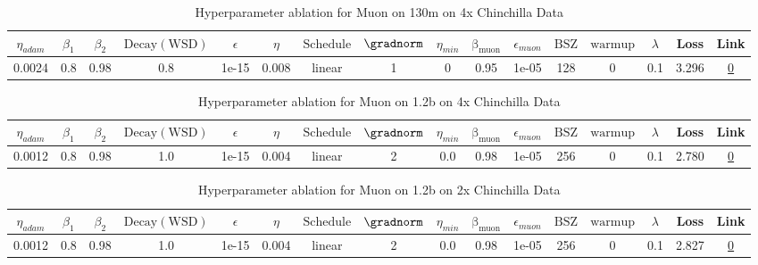 \begin{table}[H]
\centering
\caption{Hyperparameter ablation for Muon on 130m on 4x Chinchilla Data}
\label{tab:ablation_muon_130m_4}
\begin{tabular}{cccccccccccccccc}
\toprule
$\eta_{adam}$ & $\beta_1$ & $\beta_2$ & $\mathrm{Decay (WSD)}$ & $\epsilon$ & $\eta$ & $\mathrm{Schedule}$ & $\gradnorm$ & $\eta_{min}$ & $\mathrm{\beta_{muon}}$ & $\epsilon_{muon}$ & $\mathrm{BSZ}$ & $\mathrm{warmup}$ & $\lambda$ & Loss & Link \\
\midrule
0.0024 & 0.8 & 0.98 & 0.8 & 1e-15 & 0.008 & linear & 1 & 0 & 0.95 & 1e-05 & 128 & 0 & 0.1 & 3.296 & \href{https://wandb.ai/stanford-mercury/optimizer-scaling/runs/sweep-130m-10B-muonz43402blr0.008-wd0.1-minlr0-warmup0-b10.8-b20-82a88f}{0} \\
\midrule
\bottomrule
\end{tabular}
\end{table}

\begin{table}[H]
\centering
\caption{Hyperparameter ablation for Muon on 1.2b on 4x Chinchilla Data}
\label{tab:ablation_muon_1.2b_4}
\begin{tabular}{cccccccccccccccc}
\toprule
$\eta_{adam}$ & $\beta_1$ & $\beta_2$ & $\mathrm{Decay (WSD)}$ & $\epsilon$ & $\eta$ & $\mathrm{Schedule}$ & $\gradnorm$ & $\eta_{min}$ & $\mathrm{\beta_{muon}}$ & $\epsilon_{muon}$ & $\mathrm{BSZ}$ & $\mathrm{warmup}$ & $\lambda$ & Loss & Link \\
\midrule
0.0012 & 0.8 & 0.98 & 1.0 & 1e-15 & 0.004 & linear & 2 & 0.0 & 0.98 & 1e-05 & 256 & 0 & 0.1 & 2.780 & \href{https://wandb.ai/stanford-mercury/optimizer-scaling/runs/sweep-1.2b-96B-muon5ad2a1lr0.004-wd0.1-minlr0.0-warmup0.0-b10.8--05a146}{0} \\
\midrule
\bottomrule
\end{tabular}
\end{table}

\begin{table}[H]
\centering
\caption{Hyperparameter ablation for Muon on 1.2b on 2x Chinchilla Data}
\label{tab:ablation_muon_1.2b_2}
\begin{tabular}{cccccccccccccccc}
\toprule
$\eta_{adam}$ & $\beta_1$ & $\beta_2$ & $\mathrm{Decay (WSD)}$ & $\epsilon$ & $\eta$ & $\mathrm{Schedule}$ & $\gradnorm$ & $\eta_{min}$ & $\mathrm{\beta_{muon}}$ & $\epsilon_{muon}$ & $\mathrm{BSZ}$ & $\mathrm{warmup}$ & $\lambda$ & Loss & Link \\
\midrule
0.0012 & 0.8 & 0.98 & 1.0 & 1e-15 & 0.004 & linear & 2 & 0.0 & 0.98 & 1e-05 & 256 & 0 & 0.1 & 2.827 & \href{https://wandb.ai/stanford-mercury/optimizer-scaling/runs/sweep-1.2b-48B-muon09cdeclr0.004-wd0.1-minlr0.0-warmup0.0-b10.8--4f2850}{0} \\
\midrule
\bottomrule
\end{tabular}
\end{table}

